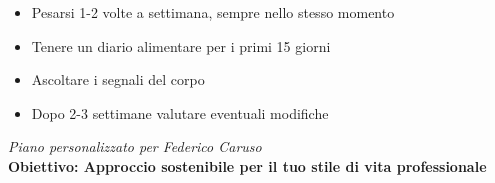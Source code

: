 \documentclass[11pt,a4paper]{article}
\begin{document}
\begin{tcolorbox}[colback=lightgray,colframe=maincolor,boxrule=1pt,arc=3pt,title=\textbf{MONITORAGGIO}]
\begin{itemize}[leftmargin=*,itemsep=5pt]
\item Pesarsi 1-2 volte a settimana, sempre nello stesso momento
\item Tenere un diario alimentare per i primi 15 giorni
\item Ascoltare i segnali del corpo
\item Dopo 2-3 settimane valutare eventuali modifiche
\end{itemize}
\end{tcolorbox}

\vfill
\begin{center}
\textit{\large Piano personalizzato per Federico Caruso}\\
\textcolor{maincolor}{\textbf{Obiettivo: Approccio sostenibile per il tuo stile di vita professionale}}
\end{center}
\end{document}
